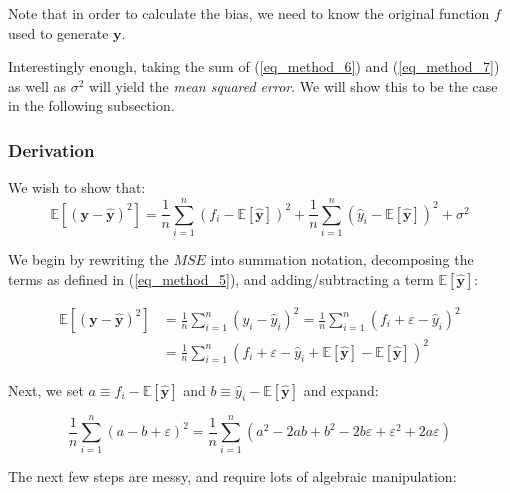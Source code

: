 \documentclass[a4paper,10pt,english]{article}
\begin{document}
Note that in order to calculate the bias, we need to know the original function $f$ used to generate $\mathbf{y}$.

Interestingly enough, taking the sum of (\ref{eq_method_6}) and (\ref{eq_method_7}) as well as $\sigma^2$ will yield the \textit{mean squared error}.  We will show this to be the case in the following subsection.

\subsubsection*{Derivation}

We wish to show that:
\begin{equation}
\label{eq_method_8}
\mathbb{E}\left[(\mathbf{y}-\hat{\mathbf{y}})^{2}\right]
=\frac{1}{n} \sum_{i=1}^{n}(f_{i}-\mathbb{E}[\hat{\mathbf{y}}])^{2}+\frac{1}{n} \sum_{i=1}^{n}(\hat{y}_{i}-\mathbb{E}[\hat{\mathbf{y}}])^{2}+\sigma^{2}
\end{equation}

We begin by rewriting the $MSE$ into summation notation, decomposing the terms as defined in (\ref{eq_method_5}), and adding/subtracting a term $\mathbb{E}[\hat{\mathbf{y}}]$:

\begin{align*}
\mathbb{E}\left[(\mathbf{y}-\hat{\mathbf{y}})^{2}\right] &= \frac{1}{n} \sum_{i=1}^{n} ( y_i - \hat{y}_i )^2 = \frac{1}{n} \sum_{i=1}^{n} ( f_i + \varepsilon - \hat{y}_i )^2 \\
&= \frac{1}{n} \sum_{i=1}^{n} ( f_i + \varepsilon - \hat{y}_i  + \mathbb{E}[\hat{\mathbf{y}}] - \mathbb{E}[\hat{\mathbf{y}}] )^2
\end{align*}

Next, we set $a \equiv f_i - \mathbb{E}[\hat{\mathbf{y}}] $ and $b \equiv \hat{y}_i - \mathbb{E}[\hat{\mathbf{y}}]$ and expand:

\begin{equation*}
\frac{1}{n} \sum_{i=1}^{n} (a - b + \varepsilon )^2
= \frac{1}{n} \sum_{i=1}^{n} ( a^2 - 2ab + b^2 - 2b\varepsilon + \varepsilon^2 + 2a\varepsilon )
\end{equation*}

The next few steps are messy, and require lots of algebraic manipulation:	
\end{document}
